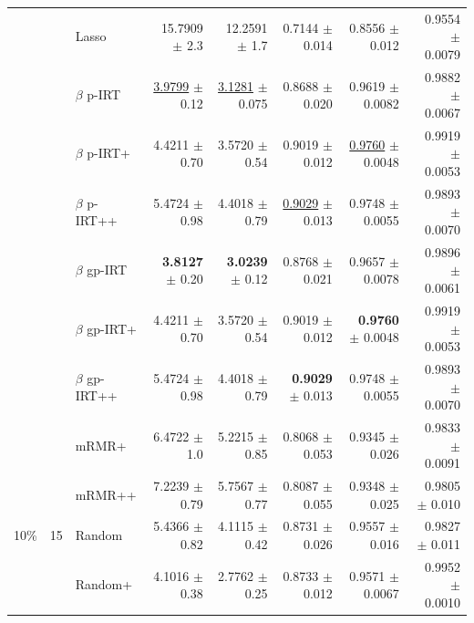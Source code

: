 \begin{longtable}{llp{}rrrrr}
 &  & Lasso & 15.7909 {\scriptsize $\pm$ 2.3} & 12.2591 {\scriptsize $\pm$ 1.7} & 0.7144 {\scriptsize $\pm$ 0.014} & 0.8556 {\scriptsize $\pm$ 0.012} & 0.9554 {\scriptsize $\pm$ 0.0079} \\
 &  & $\beta$ p-IRT & \underline{3.9799} {\scriptsize $\pm$ 0.12} & \underline{3.1281} {\scriptsize $\pm$ 0.075} & 0.8688 {\scriptsize $\pm$ 0.020} & 0.9619 {\scriptsize $\pm$ 0.0082} & 0.9882 {\scriptsize $\pm$ 0.0067} \\
 &  & $\beta$ p-IRT+ & 4.4211 {\scriptsize $\pm$ 0.70} & 3.5720 {\scriptsize $\pm$ 0.54} & 0.9019 {\scriptsize $\pm$ 0.012} & \underline{0.9760} {\scriptsize $\pm$ 0.0048} & 0.9919 {\scriptsize $\pm$ 0.0053} \\
 &  & $\beta$ p-IRT++ & 5.4724 {\scriptsize $\pm$ 0.98} & 4.4018 {\scriptsize $\pm$ 0.79} & \underline{0.9029} {\scriptsize $\pm$ 0.013} & 0.9748 {\scriptsize $\pm$ 0.0055} & 0.9893 {\scriptsize $\pm$ 0.0070} \\
 &  & $\beta$ gp-IRT & \textbf{3.8127} {\scriptsize $\pm$ 0.20} & \textbf{3.0239} {\scriptsize $\pm$ 0.12} & 0.8768 {\scriptsize $\pm$ 0.021} & 0.9657 {\scriptsize $\pm$ 0.0078} & 0.9896 {\scriptsize $\pm$ 0.0061} \\
 &  & $\beta$ gp-IRT+ & 4.4211 {\scriptsize $\pm$ 0.70} & 3.5720 {\scriptsize $\pm$ 0.54} & 0.9019 {\scriptsize $\pm$ 0.012} & \textbf{0.9760} {\scriptsize $\pm$ 0.0048} & 0.9919 {\scriptsize $\pm$ 0.0053} \\
 &  & $\beta$ gp-IRT++ & 5.4724 {\scriptsize $\pm$ 0.98} & 4.4018 {\scriptsize $\pm$ 0.79} & \textbf{0.9029} {\scriptsize $\pm$ 0.013} & 0.9748 {\scriptsize $\pm$ 0.0055} & 0.9893 {\scriptsize $\pm$ 0.0070} \\
 &  & mRMR+ & 6.4722 {\scriptsize $\pm$ 1.0} & 5.2215 {\scriptsize $\pm$ 0.85} & 0.8068 {\scriptsize $\pm$ 0.053} & 0.9345 {\scriptsize $\pm$ 0.026} & 0.9833 {\scriptsize $\pm$ 0.0091} \\
 &  & mRMR++ & 7.2239 {\scriptsize $\pm$ 0.79} & 5.7567 {\scriptsize $\pm$ 0.77} & 0.8087 {\scriptsize $\pm$ 0.055} & 0.9348 {\scriptsize $\pm$ 0.025} & 0.9805 {\scriptsize $\pm$ 0.010} \\
\midrule
10\% & 15 & Random & 5.4366 {\scriptsize $\pm$ 0.82} & 4.1115 {\scriptsize $\pm$ 0.42} & 0.8731 {\scriptsize $\pm$ 0.026} & 0.9557 {\scriptsize $\pm$ 0.016} & 0.9827 {\scriptsize $\pm$ 0.011} \\
 &  & Random+ & 4.1016 {\scriptsize $\pm$ 0.38} & 2.7762 {\scriptsize $\pm$ 0.25} & 0.8733 {\scriptsize $\pm$ 0.012} & 0.9571 {\scriptsize $\pm$ 0.0067} & 0.9952 {\scriptsize $\pm$ 0.0010} \\

\end{longtable}
